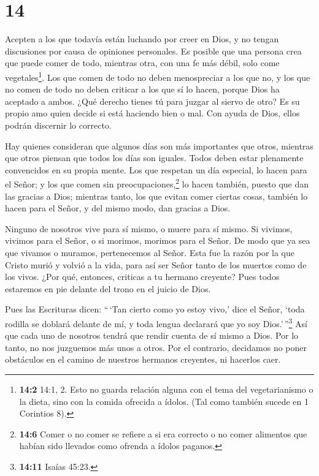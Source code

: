 \hypertarget{section-13}{%
\section{14}\label{section-13}}

 Acepten a los que todavía están luchando por creer en Dios,
y no tengan discusiones por causa de opiniones personales. 
Es posible que una persona crea que puede comer de todo, mientras otra,
con una fe más débil, solo come vegetales\footnote{\textbf{14:2} 14:1,
  2. Esto no guarda relación alguna con el tema del vegetarianismo o la
  dieta, sino con la comida ofrecida a ídolos. (Tal como también sucede
  en 1 Corintios 8).}.  Los que comen de todo no deben
menospreciar a los que no, y los que no comen de todo no deben criticar
a los que sí lo hacen, porque Dios ha aceptado a ambos. 
¿Qué derecho tienes tú para juzgar al siervo de otro? Es su propio amo
quien decide si está haciendo bien o mal. Con ayuda de Dios, ellos
podrán discernir lo correcto.

 Hay quienes consideran que algunos días son más importantes
que otros, mientras que otros piensan que todos los días son iguales.
Todos deben estar plenamente convencidos en su propia mente.
 Los que respetan un día especial, lo hacen para el Señor; y
los que comen sin preocupaciones,\footnote{\textbf{14:6} Comer o no
  comer se refiere a si era correcto o no comer alimentos que habían
  sido llevados como ofrenda a ídolos paganos.} lo hacen también, puesto
que dan las gracias a Dios; mientras tanto, los que evitan comer ciertas
cosas, también lo hacen para el Señor, y del mismo modo, dan gracias a
Dios.

 Ninguno de nosotros vive para sí mismo, o muere para sí
mismo.  Si vivimos, vivimos para el Señor, o si morimos,
morimos para el Señor. De modo que ya sea que vivamos o muramos,
pertenecemos al Señor.  Esta fue la razón por la que Cristo
murió y volvió a la vida, para así ser Señor tanto de los muertos como
de los vivos.  ¿Por qué, entonces, criticas a tu hermano
creyente? Pues todos estaremos en pie delante del trono en el juicio de
Dios.

 Pues las Escrituras dicen: ``\,`Tan cierto como yo estoy
vivo,' dice el Señor, `toda rodilla se doblará delante de mí, y toda
lengua declarará que yo soy Dios.'\,''\footnote{\textbf{14:11} Isaías
  45:23.}  Así que cada uno de nosotros tendrá que rendir
cuenta de sí mismo a Dios.  Por lo tanto, no nos juzguemos
más unos a otros. Por el contrario, decidamos no poner obstáculos en el
camino de nuestros hermanos creyentes, ni hacerlos caer.

